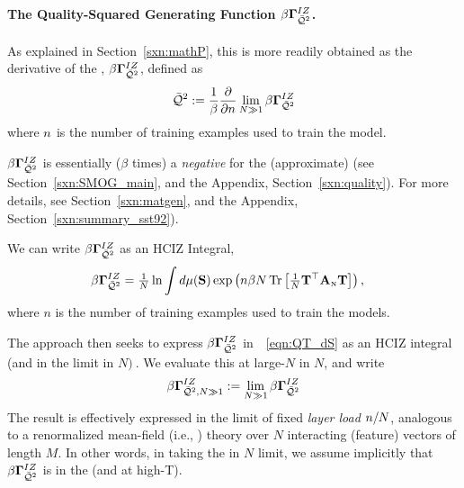 \paragraph{The Quality-Squared Generating Function $\beta\mathbf{\Gamma}^{IZ}_{\bar{\mathcal{Q}}^{2}}$.}
As explained in Section~\ref{sxn:mathP}, this \QualitySquared is more readily obtained as 
the derivative of the \LayerQualitySquared \GeneratingFunction, $\beta\mathbf{\Gamma}^{IZ}_{\bar{\mathcal{Q}}^{2}}$, defined as
\begin{align}
  \label{eqn:IZG_QT}
  \bar{\mathcal{Q}}^{2} := \dfrac{1}{\beta}\dfrac{\partial }{\partial n} \lim_{N\gg 1}\beta\mathbf{\Gamma}^{IZ}_{\bar{\mathcal{Q}}^{2}}
\end{align}
where $n$ is the number of training examples used to train the model.

$\beta\mathbf{\Gamma}^{IZ}_{\bar{\mathcal{Q}}^{2}}$ is essentially ($\beta$ times) a \emph{negative \FreeEnergy} for the (approximate) \LayerQualitySquared
(see Section~\ref{sxn:SMOG_main}, and the Appendix, Section~\ref{sxn:quality}).
For more details, see Section~\ref{sxn:matgen}, and the Appendix, Section~\ref{sxn:summary_sst92}).

We can write $\beta\mathbf{\Gamma}^{IZ}_{\bar{\mathcal{Q}}^{2}}$ as an HCIZ Integral, 
\begin{align}
  \label{eqn:QT_dS}
  \beta\mathbf{\Gamma}^{IZ}_{\bar{\mathcal{Q}}^{2}}  &= \tfrac{1}{N} \ln\int d\mu({\mathbf{S}})\exp\left(n \beta N\mbox{}\operatorname{Tr}\left[\tfrac{1}{N}{\mathbf{T}}^{\top}{\mathbf{A}}_{\text{\tiny N}}{\mathbf{T}}\right]\right),
\end{align}
where $n$ is the number of training examples used to train the models.

The \SETOL approach then seeks to express $\beta\mathbf{\Gamma}^{IZ}_{\bar{\mathcal{Q}}^{2}}$ in~\EQN~\ref{eqn:QT_dS} as an HCIZ integral (and in the \WideLayer \LargeN limit in $N$$)~$\cite{potters_bouchaud_2020,Tanaka2007,Tanaka2008}.
We evaluate this at large-$N$ in $N$, and write
\begin{equation}
  \beta\mathbf{\Gamma}^{IZ}_{\bar{\mathcal{Q}}^{2},N\gg 1}:=\lim_{N\gg 1}\beta\mathbf{\Gamma}^{IZ}_{\bar{\mathcal{Q}}^{2}}
\end{equation}
The result is effectively expressed in the limit of fixed \emph{layer load} $n/N$, analogous to a renormalized mean-field  (i.e., \SemiEmpirical) theory over $N$ interacting (feature) vectors of length $M$.
In other words, in taking the \LargeN in $N$ limit, we assume implicitly that $\beta\mathbf{\Gamma}^{IZ}_{\bar{\mathcal{Q}}^{2}}$ is in the \ThermodynamicLimit (and at high-T).

